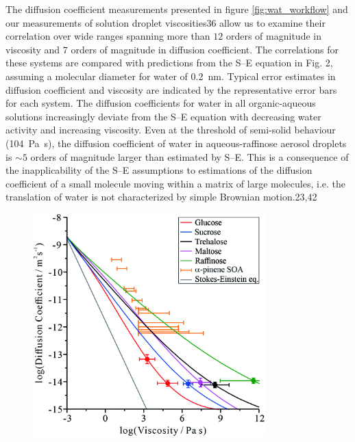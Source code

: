 The diffusion coefficient measurements presented in figure \ref{fig:wat_workflow} and our measurements of solution droplet viscosities36 allow us to examine their correlation over wide ranges spanning more than $12$ orders of magnitude in viscosity and $7$ orders of magnitude in diffusion coefficient. The correlations for these systems are compared with predictions from the S–E equation in Fig. 2, assuming a molecular diameter for water of \SI{0.2}{\nano\meter}. Typical error estimates in diffusion coefficient and viscosity are indicated by the representative error bars for each system. The diffusion coefficients for water in all organic-aqueous solutions increasingly deviate from the S–E equation with decreasing water activity and increasing viscosity. Even at the threshold of semi-solid behaviour (\SI{104}{\pascal\second}), the diffusion coefficient of water in aqueous-raffinose aerosol droplets is $\sim 5$ orders of magnitude larger than estimated by S–E. This is a consequence of the inapplicability of the S–E assumptions to estimations of the diffusion coefficient of a small molecule moving within a matrix of large molecules, i.e. the translation of water is not characterized by simple Brownian motion.23,42

\begin{figure}
    \centering
    \includegraphics[width=0.8\textwidth]{chapters/water_hopping/figures/f2.png}
    \label{fig:wat_diff_coef_corr}
\end{figure}


